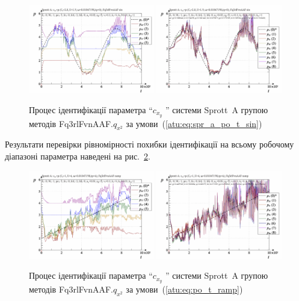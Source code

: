 \begin{figure}[htb!]
  \centerline{
    \includegraphics[width=0.49\textwidth]{p/cha/spr_a/Fq3rlFvnAAF_x2/sprott_a_id-p_t_pi_Fq3rlFvnAAF_sin.png}
    \hfill
    \includegraphics[width=0.49\textwidth]{p/cha/spr_a/Fq3rlFvnAAF_x2/sprott_a_id-p_t_p_Fq3rlFvnAAF_sin.png}
  }
\caption{Процес ідентифікації параметра ``$ c_{x_y} $ '' системи Sprott~A групою методів Fq3rlFvnAAF.$q_{x^2} $ за умови~(\ref{atu:eq:spr_a_po_t_sin})}
\label{atu:f:spr_a_id_Fq3rlFvnAAF_q_x2_sin}
\end{figure}

Результати перевірки рівномірності похибки ідентифікації
на всьому робочому діапазоні параметра наведені на
рис.~\ref{atu:f:spr_a_id_Fq3rlFvnAAF_q_x2_ramp}.


\begin{figure}[htb!]
  \centerline{
    \includegraphics[width=0.49\textwidth]{p/cha/spr_a/Fq3rlFvnAAF_x2/sprott_a_id-p_t_pi_Fq3rlFvnAAF_ramp.png}
    \hfill
    \includegraphics[width=0.49\textwidth]{p/cha/spr_a/Fq3rlFvnAAF_x2/sprott_a_id-p_t_p_Fq3rlFvnAAF_ramp.png}
  }
\caption{Процес ідентифікації параметра ``$ c_{x_y} $ '' системи Sprott~A групою методів Fq3rlFvnAAF.$q_{x^2} $ за умови~(\ref{atu:eq:po_t_ramp})}
  \label{atu:f:spr_a_id_Fq3rlFvnAAF_q_x2_ramp}
\end{figure}

